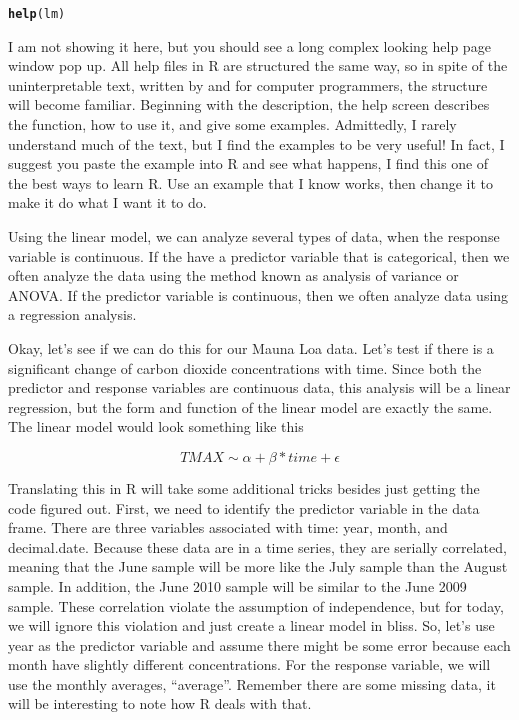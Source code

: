 \documentclass{article}\usepackage[]{graphicx}\usepackage[]{color}
\makeatletter
\newcommand{\hlstd}[1]{\textcolor[rgb]{0.345,0.345,0.345}{#1}}%
\newcommand{\hlkwd}[1]{\textcolor[rgb]{0.737,0.353,0.396}{\textbf{#1}}}%
\newenvironment{kframe}{%
 \def\at@end@of@kframe{}%
 \ifinner\ifhmode%
  \def\at@end@of@kframe{\end{minipage}}%
  \begin{minipage}{\columnwidth}%
 \fi\fi%
 \def\FrameCommand##1{\hskip\@totalleftmargin \hskip-\fboxsep
 \colorbox{shadecolor}{##1}\hskip-\fboxsep
     \hskip-\linewidth \hskip-\@totalleftmargin \hskip\columnwidth}%
 \MakeFramed {\advance\hsize-\width
   \@totalleftmargin\z@ \linewidth\hsize
   \@setminipage}}%
 {\par\unskip\endMakeFramed%
 \at@end@of@kframe}
\newenvironment{knitrout}{}{} %
\makeatother
\begin{document}
\begin{knitrout}
\color{fgcolor}\begin{kframe}
\begin{alltt}
\hlkwd{help}\hlstd{(lm)}
\end{alltt}
\end{kframe}
\end{knitrout}

I am not showing it here, but you should see a long complex looking help page window pop up. All help files in R are structured the same way, so in spite of the uninterpretable text, written by and for computer programmers, the structure will become familiar. Beginning with the description, the help screen describes the function, how to use it, and give some examples. Admittedly, I rarely understand much of the text, but I find the examples to be very useful! In fact, I suggest you paste the example into R and see what happens, I find this one of the best ways to learn R. Use an example that I know works, then change it to make it do what I want it to do.

Using the linear model, we can analyze several types of data, when the response variable is continuous. If the have a predictor variable that is categorical, then we often analyze the data using the method known as analysis of variance or ANOVA. If the predictor variable is continuous, then we often analyze data using a regression analysis. 

Okay, let's see if we can do this for our Mauna Loa data. Let's test if there is a significant change of carbon dioxide concentrations with time. Since both the predictor and response variables are continuous data, this analysis will be a linear regression, but the form and function of the linear model are exactly the same. The linear model would look something like this

\begin{equation}
TMAX \sim \alpha + \beta * time + \epsilon
\end{equation}

Translating this in R will take some additional tricks besides just getting the code figured out. First, we need to identify the predictor variable in the data frame. There are three variables associated with time: year, month, and decimal.date. Because these data are in a time series, they are serially correlated, meaning that the June sample will be more like the July sample than the August sample. In addition, the June 2010 sample will be similar to the June 2009 sample. These correlation violate the assumption of independence, but for today, we will ignore this violation and just create a linear model in bliss. So, let's use year as the predictor variable and assume there might be some error because each month have slightly different concentrations. For the response variable, we will use the monthly averages, "`average"'. Remember there are some missing data, it will be interesting to note how R deals with that.
\end{document}
